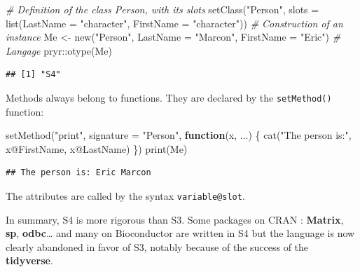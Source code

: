 \documentclass[
  12pt,
  american,
  a4paper,
  extrafontsizes,onecolumn,openright
  ]{memoir}
\newenvironment{Shaded}{\begin{snugshade}}{\end{snugshade}}
\newcommand{\AttributeTok}[1]{\textcolor[rgb]{0.77,0.63,0.00}{#1}}
\newcommand{\CommentTok}[1]{\textcolor[rgb]{0.56,0.35,0.01}{\textit{#1}}}
\newcommand{\ControlFlowTok}[1]{\textcolor[rgb]{0.13,0.29,0.53}{\textbf{#1}}}
\newcommand{\FunctionTok}[1]{\textcolor[rgb]{0.00,0.00,0.00}{#1}}
\newcommand{\NormalTok}[1]{#1}
\newcommand{\OtherTok}[1]{\textcolor[rgb]{0.56,0.35,0.01}{#1}}
\newcommand{\SpecialCharTok}[1]{\textcolor[rgb]{0.00,0.00,0.00}{#1}}
\newcommand{\StringTok}[1]{\textcolor[rgb]{0.31,0.60,0.02}{#1}}
\begin{document}
\scriptsize

\begin{Shaded}
\begin{Highlighting}[]
\CommentTok{\# Definition of the class Person, with its slots}
\FunctionTok{setClass}\NormalTok{(}\StringTok{"Person"}\NormalTok{,  }
         \AttributeTok{slots =} \FunctionTok{list}\NormalTok{(}\AttributeTok{LastName =} \StringTok{"character"}\NormalTok{, }\AttributeTok{FirstName =} \StringTok{"character"}\NormalTok{))}
\CommentTok{\#  Construction of an instance}
\NormalTok{Me }\OtherTok{\textless{}{-}} \FunctionTok{new}\NormalTok{(}\StringTok{"Person"}\NormalTok{, }\AttributeTok{LastName =} \StringTok{"Marcon"}\NormalTok{, }\AttributeTok{FirstName =} \StringTok{"Eric"}\NormalTok{)}
\CommentTok{\# Langage}
\NormalTok{pryr}\SpecialCharTok{::}\FunctionTok{otype}\NormalTok{(Me)}
\end{Highlighting}
\end{Shaded}

\begin{verbatim}
## [1] "S4"
\end{verbatim}

\normalsize

Methods always belong to functions.
They are declared by the \texttt{setMethod()} function:

\scriptsize

\begin{Shaded}
\begin{Highlighting}[]
\FunctionTok{setMethod}\NormalTok{(}\StringTok{"print"}\NormalTok{, }\AttributeTok{signature =} \StringTok{"Person"}\NormalTok{, }\ControlFlowTok{function}\NormalTok{(x, ...) \{}
    \FunctionTok{cat}\NormalTok{(}\StringTok{"The person is:"}\NormalTok{, x}\SpecialCharTok{@}\NormalTok{FirstName, x}\SpecialCharTok{@}\NormalTok{LastName)}
\NormalTok{\})}
\FunctionTok{print}\NormalTok{(Me)}
\end{Highlighting}
\end{Shaded}

\begin{verbatim}
## The person is: Eric Marcon
\end{verbatim}

\normalsize

The attributes are called by the syntax \texttt{variable@slot}.

In summary, S4 is more rigorous than S3.
Some packages on CRAN : \textbf{Matrix}, \textbf{sp}, \textbf{odbc}\ldots{} and many on Bioconductor are written in S4 but the language is now clearly abandoned in favor of S3, notably because of the success of the \textbf{tidyverse}.
\end{document}
